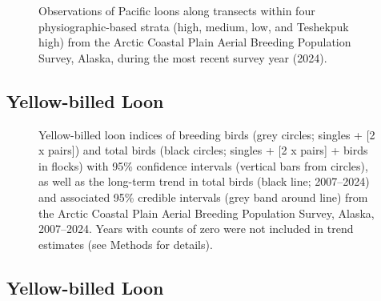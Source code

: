 \documentclass[
]{article}
\begin{document}
\begin{figure}


\caption{\label{fig-PALOmap}Observations of Pacific loons along
transects within four physiographic-based strata (high, medium, low, and
Teshekpuk high) from the Arctic Coastal Plain Aerial Breeding Population
Survey, Alaska, during the most recent survey year (2024).}

\end{figure}%

\newpage{}

\subsection*{Yellow-billed Loon}\label{yellow-billed-loon}

\begin{figure}


\caption{\label{fig-YBLO}Yellow-billed loon indices of breeding birds
(grey circles; singles + {[}2 x pairs{]}) and total birds (black
circles; singles + {[}2 x pairs{]} + birds in flocks) with 95\%
confidence intervals (vertical bars from circles), as well as the
long-term trend in total birds (black line; 2007--2024) and associated
95\% credible intervals (grey band around line) from the Arctic Coastal
Plain Aerial Breeding Population Survey, Alaska, 2007--2024. Years with
counts of zero were not included in trend estimates (see Methods for
details).}

\end{figure}%

\newpage{}

\subsection*{Yellow-billed Loon}\label{yellow-billed-loon-1}

\begingroup\fontsize{10}{12}\selectfont
\end{document}
